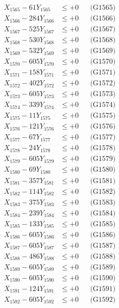 \documentclass[a4paper,10pt]{article}
\begin{document}
{\begin{align}
X_{1565} - 61Y_{1565} &\leq +0 && \text{(G1565)} \\
X_{1566} - 284Y_{1566} &\leq +0 && \text{(G1566)} \\
X_{1567} - 525Y_{1567} &\leq +0 && \text{(G1567)} \\
X_{1568} - 530Y_{1568} &\leq +0 && \text{(G1568)} \\
X_{1569} - 532Y_{1569} &\leq +0 && \text{(G1569)} \\
X_{1570} - 605Y_{1570} &\leq +0 && \text{(G1570)} \\
\allowbreak
X_{1571} - 158Y_{1571} &\leq +0 && \text{(G1571)} \\
X_{1572} - 402Y_{1572} &\leq +0 && \text{(G1572)} \\
X_{1573} - 605Y_{1573} &\leq +0 && \text{(G1573)} \\
X_{1574} - 339Y_{1574} &\leq +0 && \text{(G1574)} \\
X_{1575} - 11Y_{1575} &\leq +0 && \text{(G1575)} \\
X_{1576} - 121Y_{1576} &\leq +0 && \text{(G1576)} \\
X_{1577} - 67Y_{1577} &\leq +0 && \text{(G1577)} \\
X_{1578} - 24Y_{1578} &\leq +0 && \text{(G1578)} \\
X_{1579} - 605Y_{1579} &\leq +0 && \text{(G1579)} \\
X_{1580} - 69Y_{1580} &\leq +0 && \text{(G1580)} \\
\allowbreak
X_{1581} - 357Y_{1581} &\leq +0 && \text{(G1581)} \\
X_{1582} - 114Y_{1582} &\leq +0 && \text{(G1582)} \\
X_{1583} - 375Y_{1583} &\leq +0 && \text{(G1583)} \\
X_{1584} - 239Y_{1584} &\leq +0 && \text{(G1584)} \\
X_{1585} - 133Y_{1585} &\leq +0 && \text{(G1585)} \\
X_{1586} - 605Y_{1586} &\leq +0 && \text{(G1586)} \\
X_{1587} - 605Y_{1587} &\leq +0 && \text{(G1587)} \\
X_{1588} - 486Y_{1588} &\leq +0 && \text{(G1588)} \\
X_{1589} - 605Y_{1589} &\leq +0 && \text{(G1589)} \\
X_{1590} - 605Y_{1590} &\leq +0 && \text{(G1590)} \\
\allowbreak
X_{1591} - 124Y_{1591} &\leq +0 && \text{(G1591)} \\
X_{1592} - 605Y_{1592} &\leq +0 && \text{(G1592)} \\

\end{align}}
\end{document}
